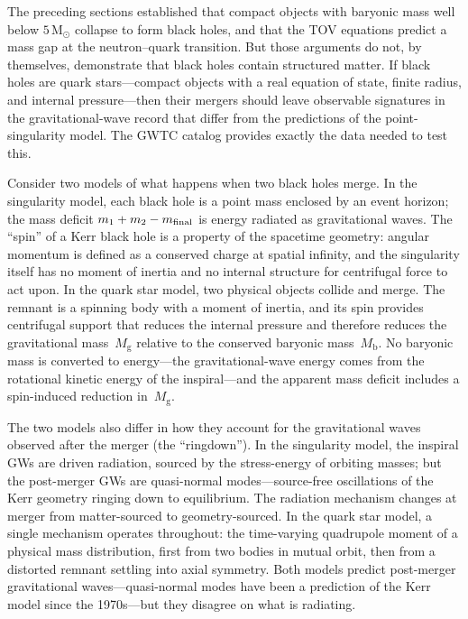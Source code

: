 \documentclass[manuscript,linenumbers]{aastex701}
\newcommand{\Msun}{\mathrm{M}_\odot}
\newcommand{\Mg}{M_{\mathrm{g}}}
\newcommand{\Mb}{M_{\mathrm{b}}}
\begin{document}
The preceding sections established that compact objects with baryonic
mass well below $5\,\Msun$ collapse to form black holes, and that
the TOV equations predict a mass gap at the neutron--quark transition.
But those arguments do not, by themselves, demonstrate that black holes
contain structured matter.  If black holes are quark stars---compact
objects with a real equation of state, finite radius, and internal
pressure---then their mergers should leave observable signatures in the
gravitational-wave record that differ from the predictions of the
point-singularity model.  The GWTC catalog \citep{GWTC3,GWOSC2023}
provides exactly the data needed to test this.

Consider two models of what happens when two black holes merge.  In the
singularity model, each black hole is a point mass enclosed by an event
horizon; the mass deficit $m_1 + m_2 - m_{\rm final}$ is energy
radiated as gravitational waves.  The ``spin'' of a Kerr black hole is
a property of the spacetime geometry: angular momentum is defined as a
conserved charge at spatial infinity, and the singularity itself has no
moment of inertia and no internal structure for centrifugal force to act
upon.  In the quark star model, two physical objects collide and merge.
The remnant is a spinning body with a moment of inertia, and its spin
provides centrifugal support that reduces the internal pressure and
therefore reduces the gravitational mass~$\Mg$ relative to the conserved
baryonic mass~$\Mb$.  No baryonic mass is converted to energy---the
gravitational-wave energy comes from the rotational kinetic energy of
the inspiral---and the apparent mass deficit includes a spin-induced
reduction in~$\Mg$.

The two models also differ in how they account for the gravitational
waves observed after the merger (the ``ringdown'').  In the singularity
model, the inspiral GWs are driven radiation, sourced by the
stress-energy of orbiting masses; but the post-merger GWs are
quasi-normal modes---source-free oscillations of the Kerr geometry
ringing down to equilibrium.  The radiation mechanism changes at
merger from matter-sourced to geometry-sourced.  In the quark star
model, a single mechanism operates throughout: the time-varying
quadrupole moment of a physical mass distribution, first from two
bodies in mutual orbit, then from a distorted remnant settling into
axial symmetry.  Both models predict post-merger gravitational
waves---quasi-normal modes have been a prediction of the Kerr model
since the 1970s---but they disagree on what is radiating.
\end{document}

